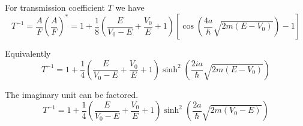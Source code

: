 For transmission coefficient $T$ we have
\begin{equation*}
T^{-1}=\frac{A}{F}\left(\frac{A}{F}\right)^*
=1+\frac{1}{8}\left(\frac{E}{V_0-E}+\frac{V_0}{E}+1\right)
\left[\cos\left(\frac{4a}{\hbar}\sqrt{2m(E-V_0)}\right)-1\right]
\tag{5}
\end{equation*}

Equivalently
\begin{equation*}
T^{-1}=1+\frac{1}{4}\left(\frac{E}{V_0-E}+\frac{V_0}{E}+1\right)
\sinh^2\left(\frac{2ia}{\hbar}\sqrt{2m(E-V_0)}\right)
\tag{6}
\end{equation*}

The imaginary unit can be factored.
\begin{equation*}
T^{-1}=1+\frac{1}{4}\left(\frac{E}{V_0-E}+\frac{V_0}{E}+1\right)
\sinh^2\left(\frac{2a}{\hbar}\sqrt{2m(V_0-E)}\right)
\end{equation*}


